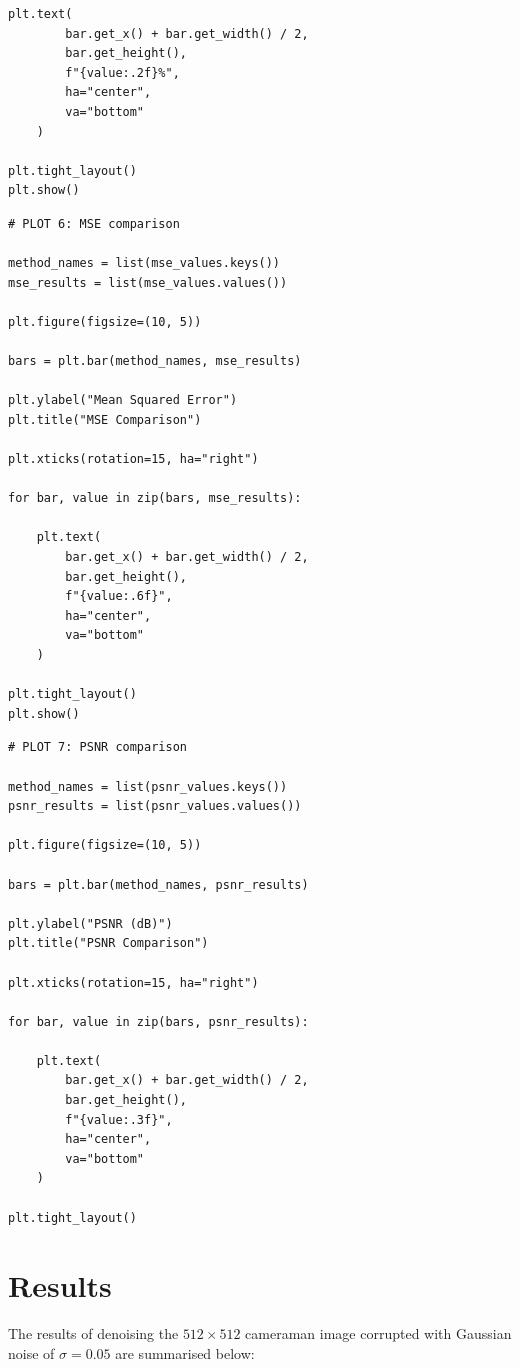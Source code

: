 \documentclass{article}
\begin{document}
\begin{flushleft}
\begin{lstlisting}[caption={Plotting singular-value energy retention}]
    plt.text(
        bar.get_x() + bar.get_width() / 2,
        bar.get_height(),
        f"{value:.2f}%",
        ha="center",
        va="bottom"
    )

plt.tight_layout()
plt.show()
\end{lstlisting}

\begin{lstlisting}[caption={Plotting the MSE comparison}]
# PLOT 6: MSE comparison

method_names = list(mse_values.keys())
mse_results = list(mse_values.values())

plt.figure(figsize=(10, 5))

bars = plt.bar(method_names, mse_results)

plt.ylabel("Mean Squared Error")
plt.title("MSE Comparison")

plt.xticks(rotation=15, ha="right")

for bar, value in zip(bars, mse_results):

    plt.text(
        bar.get_x() + bar.get_width() / 2,
        bar.get_height(),
        f"{value:.6f}",
        ha="center",
        va="bottom"
    )

plt.tight_layout()
plt.show()
\end{lstlisting}

\begin{lstlisting}[caption={Plotting the PSNR comparison}]
# PLOT 7: PSNR comparison

method_names = list(psnr_values.keys())
psnr_results = list(psnr_values.values())

plt.figure(figsize=(10, 5))

bars = plt.bar(method_names, psnr_results)

plt.ylabel("PSNR (dB)")
plt.title("PSNR Comparison")

plt.xticks(rotation=15, ha="right")

for bar, value in zip(bars, psnr_results):

    plt.text(
        bar.get_x() + bar.get_width() / 2,
        bar.get_height(),
        f"{value:.3f}",
        ha="center",
        va="bottom"
    )

plt.tight_layout()
\end{lstlisting}


\newpage
\section{Results}
The results of denoising the $512 \times 512$ cameraman image corrupted with Gaussian noise of $\sigma = 0.05$ are summarised below:


\end{flushleft}
\end{document}
